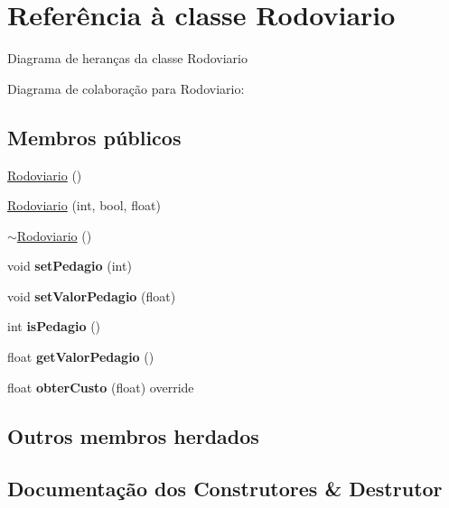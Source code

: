 \hypertarget{classRodoviario}{}\section{Referência à classe Rodoviario}
\label{classRodoviario}


Diagrama de heranças da classe Rodoviario


Diagrama de colaboração para Rodoviario\+:
\subsection*{Membros públicos}
\begin{DoxyCompactItemize}
\item 
\hyperlink{classRodoviario_a91f98005c09609f74f4de02c1907481d}{Rodoviario} ()
\item 
\hyperlink{classRodoviario_a56cdc15643e5d023e2d4c61139ecc16d}{Rodoviario} (int, bool, float)
\item 
\hyperlink{classRodoviario_a11df25b437139f12013adc0d861b7970}{$\sim$\+Rodoviario} ()
\item 
\mbox{\label{classRodoviario_a14273f1bc7d5a0b237846749fbe2221e}} 
void {\bfseries set\+Pedagio} (int)
\item 
\mbox{\label{classRodoviario_a920f911349153ac9e95df101fe1afe0c}} 
void {\bfseries set\+Valor\+Pedagio} (float)
\item 
\mbox{\label{classRodoviario_aa3c5c3b649b9aa4bde43e2154b940c89}} 
int {\bfseries is\+Pedagio} ()
\item 
\mbox{\label{classRodoviario_a4c62b1d1a5e924a60b185b2023034943}} 
float {\bfseries get\+Valor\+Pedagio} ()
\item 
\mbox{\label{classRodoviario_a907ec064fb54db8a05b480cf58c5fe57}} 
float {\bfseries obter\+Custo} (float) override
\end{DoxyCompactItemize}
\subsection*{Outros membros herdados}


\subsection{Documentação dos Construtores \& Destrutor}
\mbox{\label{classRodoviario_a91f98005c09609f74f4de02c1907481d}} 

